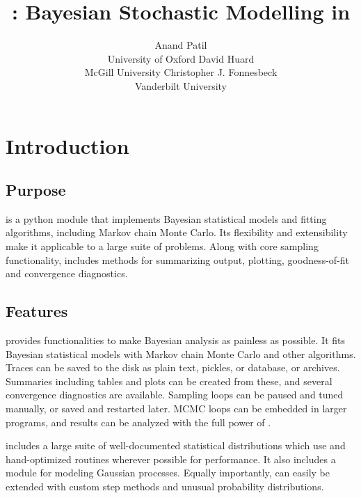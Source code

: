 \documentclass[]{jss}
\author{Anand Patil\\University of Oxford \And
        David Huard\\McGill University  \And
		Christopher J. Fonnesbeck\\Vanderbilt University}
\title{\pkg{PyMC} : Bayesian Stochastic Modelling in \proglang{Python}}
\begin{document}
\maketitle


\section[Introduction]{Introduction}
\label{chap:intro}


\subsection{Purpose}
\label{purpose}

 is a python module that implements Bayesian statistical models and
fitting algorithms, including Markov chain Monte Carlo.
Its flexibility and extensibility make it applicable to a large suite of problems. Along with core sampling functionality,  includes
methods for summarizing output, plotting, goodness-of-fit and convergence
diagnostics.


\subsection{Features}
\label{features}

 provides functionalities to make Bayesian analysis as painless as
possible. It fits Bayesian statistical models with Markov chain Monte Carlo and
other algorithms. Traces can be saved to the disk as plain text,  pickles,  \citep{sqlite} or  \citep{mysql} 
database, or  \citep{hdf5}  archives. Summaries including tables and plots can be created from these, and several convergence diagnostics are available. Sampling loops can be paused and tuned manually, or saved and restarted later. MCMC loops can be embedded in larger programs, and results can be analyzed
with the full power of .


 includes a large suite of well-documented statistical distributions which use  \citep{numpy}  and hand-optimized  routines wherever possible for performance. It also includes a module for modeling Gaussian processes. Equally importantly,  can easily be extended with custom step methods and unusual probability distributions.
\end{document}
